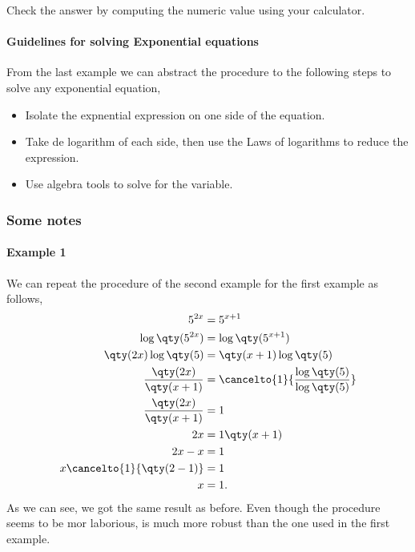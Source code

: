 \documentclass[../main.tex]{subfiles}
\begin{document}
Check the answer by computing the numeric value using your calculator.

\paragraph{Guidelines for solving Exponential equations} From the last example we can abstract the procedure to the following steps to solve any exponential equation,
\begin{itemize}
    \item Isolate the expnential expression on one side of the equation.
    \item Take de logarithm of each side, then use the Laws of logarithms to reduce the expression.
    \item Use algebra tools to solve for the variable.
\end{itemize}

\subsubsection{Some notes}

\paragraph{Example 1} We can repeat the procedure of the second example for the first example as follows,
\begin{align*}
    5^{2x} &= 5^{x+1} \\
    \log\qty(5^{2x}) &= \log\qty(5^{x+1}) \\
    \qty(2x)\log\qty(5) &= \qty(x+1)\log\qty(5) \\
    \frac{\qty(2x)}{\qty(x+1)} &= \cancelto{1}{\frac{\log\qty(5)}{\log\qty(5)}} \\
    \frac{\qty(2x)}{\qty(x+1)} &= 1 \\
    2x &= 1\qty(x+1) \\
    2x-x &= 1 \\
    x\cancelto{1}{\qty(2-1)} &= 1 \\
    x &= 1.
\end{align*}
As we can see, we got the same result as before.
Even though the procedure seems to be mor laborious, is much more robust than the one used in the first example.
\end{document}
